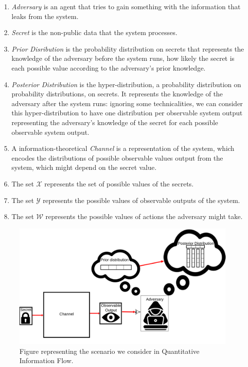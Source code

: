 \documentclass[conference]{IEEEtran}
\begin{document}
\begin{enumerate}
\item \emph{Adversary} is an agent that tries to gain something with the information that leaks from the system.
\item \emph{Secret} is the non-public data that the system processes.
\item \emph{Prior Disribution} is the probability distribution on secrets that represents the knowledge of the adversary before the system runs, how likely the secret is each possible value according to the adversary's prior knowledge.
\item \emph{Posterior Distribution} is the hyper-distribution, a probability distribution on probability distributions, on secrets. It represents the knowledge of the adversary after the system runs: ignoring some technicalities, we can consider this hyper-distribution to have one distribution per observable system output representing the adversary's knowledge of the secret for each possible observable system output.
\item A information-theoretical \emph{Channel} is a representation of the system, which encodes the distributions of possible observable values output from the system, which might depend on the secret value.
\item The set $\mathcal{X}$ represents the set of possible values of the secrets.
\item The set $\mathcal{Y}$ represents the possible values of observable outputs of the system.
\item The set $\mathcal{W}$ represents the possible values of actions the adversary might take.
\end{enumerate}

\begin{figure}[ht]
\centering
\includegraphics[width=\columnwidth]{channelAndFriends}
\caption{Figure representing the scenario we consider in Quantitative Information Flow.}\label{fig:channelAndFriends}
\end{figure}
\end{document}

